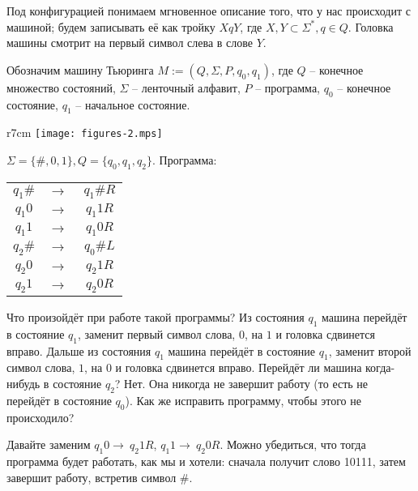 Под конфигурацией понимаем мгновенное описание того, что у нас происходит с машиной; будем записывать её как
тройку $XqY$, где $X, Y \subset \Sigma^*, q \in Q$. Головка машины смотрит на первый символ слева в слове $Y$.

Обозначим машину Тьюринга $M:=(Q, \Sigma, P, q_0, q_1)$, где $Q$ -- конечное множество состояний,
$\Sigma$ -- ленточный алфавит, $P$ -- программа, $q_0$ -- конечное состояние, $q_1$ -- начальное состояние.
\begin{wrapfigure}{r}{7cm}
	\texttt{[image: figures-2.mps]}
\end{wrapfigure}

\begin{example}
	$\Sigma = \{\#, 0, 1 \}, Q = \{q_0, q_1, q_2\}$. Программа:
	\begin{tabular}{c c c} 
		$q_{1}\#$ & $\to\ $& $q_{1}\#R$ \\ $q_{1}0$ & $\to\ $& $q_{1}1R$ \\ $q_{1}1$ & $\to\ $& $q_{1}0R$ \\
		$q_{2}\#$ & $\to\ $&
		$q_{0}\#L$ \\ $q_{2}0$ & $\to\ $& $q_{2}1R$ \\ $q_{2}1$ & $\to\ $& $q_{2}0R$ \\ 
	\end{tabular}
	\par Что произойдёт при работе такой программы?  Из состояния $q_{1}$ машина перейдёт в состояние $q_{1}$, заменит
	первый символ слова, $0$, на $1$ и головка сдвинется вправо. Дальше из состояния $q_{1}$ машина перейдёт в
	состояние $q_{1}$, заменит второй символ слова, $1$, на $0$ и головка сдвинется вправо. Перейдёт ли машина
	когда-нибудь в состояние $q_{2}$? Нет. Она никогда не завершит работу (то есть не перейдёт в состояние
	$q_{0}$). Как же исправить программу, чтобы этого не происходило? 
	\par Давайте заменим $q_{1}0 \to\ q_{2}1R$, $q_{1}1 \to\ q_{2}0R$. Можно убедиться, что тогда программа будет
	работать, как мы и хотели: сначала получит слово 10111, затем завершит работу, встретив символ $\#$.
\end{example}
